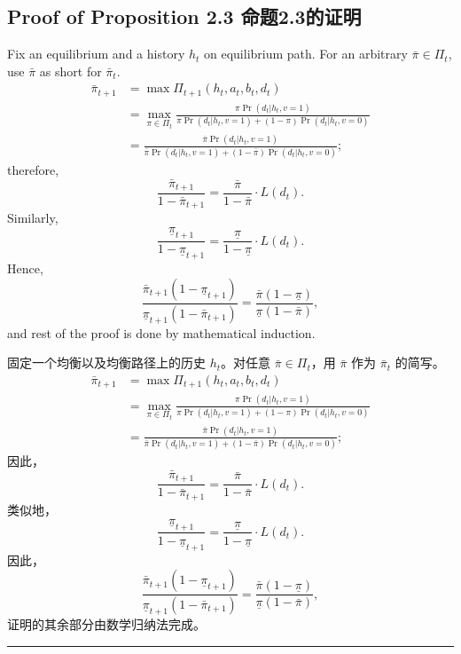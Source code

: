 \documentclass[12pt,a4paper]{article}
\newenvironment{original}{%
  \par\vspace{4pt}\noindent%
  \color{black}%
  \ignorespaces
}{%
  \par\vspace{2pt}%
}
\newenvironment{translation}{%
  \par\vspace{2pt}\noindent%
  \color{transblue}%
  \ignorespaces
}{%
  \par\vspace{4pt}\hrule\vspace{6pt}%
}
\begin{document}
\subsection*{Proof of Proposition 2.3 \hfill 命题2.3的证明}

\begin{original}
Fix an equilibrium and a history $h_t$ on equilibrium path. For an arbitrary $\bar{\pi} \in \Pi_t$, use $\bar{\pi}$ as short for $\bar{\pi}_t$.
\begin{align*}
\bar{\pi}_{t+1} &= \max \Pi_{t+1}(h_t, a_t, b_t, d_t) \\
&= \max_{\pi\in\Pi_t} \frac{\pi \Pr(d_t|h_t, v = 1)}{\pi \Pr(d_t|h_t, v = 1) + (1 - \pi) \Pr(d_t|h_t, v = 0)} \\
&= \frac{\bar{\pi} \Pr(d_t|h_t, v = 1)}{\bar{\pi} \Pr(d_t|h_t, v = 1) + (1 - \bar{\pi}) \Pr(d_t|h_t, v = 0)};
\end{align*}
therefore,
\[
\frac{\bar{\pi}_{t+1}}{1 - \bar{\pi}_{t+1}} = \frac{\bar{\pi}}{1 - \bar{\pi}} \cdot L(d_t).
\]
Similarly,
\[
\frac{\underline{\pi}_{t+1}}{1 - \underline{\pi}_{t+1}} = \frac{\underline{\pi}}{1 - \underline{\pi}} \cdot L(d_t).
\]
Hence,
\[
\frac{\bar{\pi}_{t+1}(1 - \underline{\pi}_{t+1})}{\underline{\pi}_{t+1}(1 - \bar{\pi}_{t+1})} = \frac{\bar{\pi}(1 - \underline{\pi})}{\underline{\pi}(1 - \bar{\pi})},
\]
and rest of the proof is done by mathematical induction.
\end{original}
\begin{translation}
固定一个均衡以及均衡路径上的历史 $h_t$。对任意 $\bar{\pi} \in \Pi_t$，用 $\bar{\pi}$ 作为 $\bar{\pi}_t$ 的简写。
\begin{align*}
\bar{\pi}_{t+1} &= \max \Pi_{t+1}(h_t, a_t, b_t, d_t) \\
&= \max_{\pi\in\Pi_t} \frac{\pi \Pr(d_t|h_t, v = 1)}{\pi \Pr(d_t|h_t, v = 1) + (1 - \pi) \Pr(d_t|h_t, v = 0)} \\
&= \frac{\bar{\pi} \Pr(d_t|h_t, v = 1)}{\bar{\pi} \Pr(d_t|h_t, v = 1) + (1 - \bar{\pi}) \Pr(d_t|h_t, v = 0)};
\end{align*}
因此，
\[
\frac{\bar{\pi}_{t+1}}{1 - \bar{\pi}_{t+1}} = \frac{\bar{\pi}}{1 - \bar{\pi}} \cdot L(d_t).
\]
类似地，
\[
\frac{\underline{\pi}_{t+1}}{1 - \underline{\pi}_{t+1}} = \frac{\underline{\pi}}{1 - \underline{\pi}} \cdot L(d_t).
\]
因此，
\[
\frac{\bar{\pi}_{t+1}(1 - \underline{\pi}_{t+1})}{\underline{\pi}_{t+1}(1 - \bar{\pi}_{t+1})} = \frac{\bar{\pi}(1 - \underline{\pi})}{\underline{\pi}(1 - \bar{\pi})},
\]
证明的其余部分由数学归纳法完成。
\end{translation}
\end{document}
